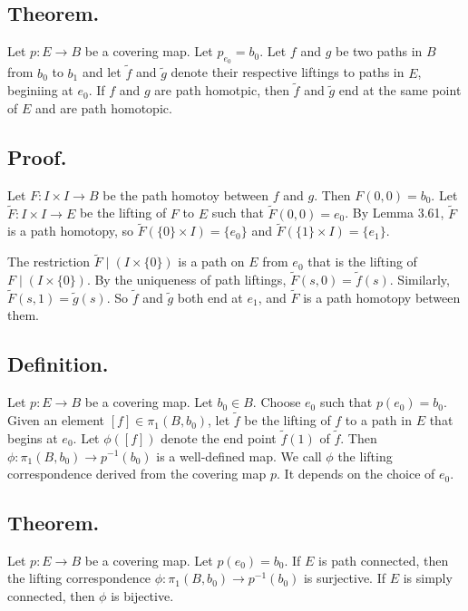 \documentclass[titlepage]{article}
\begin{document}
\subsection{Theorem.} Let $p: E \to B$ be a covering map. Let $p_{e_{0}} = b_{0}$. Let $f$ and $g$ be two paths in $B$ from $b_{0}$ to $b_{1}$ and let $\tilde{f}$ and $\tilde{g}$ denote their respective liftings to paths in $E$, beginiing at $e_{0}$. If $f$ and $g$ are path homotpic, then $\tilde{f}$ and $\tilde{g}$ end at the same point of $E$ and are path homotopic.

\subsection{Proof.} Let $F: I \times I \to B$ be the path homotoy between $f$ and $g$. Then $F(0, 0) = b_{0}$. Let $\tilde{F}: I \times I \to E$ be the lifting of $F$ to $E$ such that $\tilde{F}(0, 0) = e_{0}$. By Lemma 3.61, $\tilde{F}$ is a path homotopy, so $\tilde{F}(\{0\} \times I) = \{e_{0}\}$ and $\tilde{F}(\{1\} \times I) = \{e_{1}\}$.

The restriction $\tilde{F} \mid (I \times \{0\})$ is a path on $E$ from $e_{0}$ that is the lifting of $F \mid (I \times \{0\})$. By the uniqueness of path liftings, $\tilde{F}(s, 0) = \tilde{f}(s)$. Similarly, $\tilde{F}(s, 1) = \tilde{g}(s)$. So $\tilde{f}$ and $\tilde{g}$ both end at $e_{1}$, and $\tilde{F}$ is a path homotopy between them.

\subsection{Definition.} Let $p: E \to B$ be a covering map. Let $b_{0} \in B$. Choose $e_{0}$ such that $p(e_{0}) = b_{0}$. Given an element $[f] \in \pi_{1}(B, b_{0})$, let $\tilde{f}$ be the lifting of $f$ to a path in $E$ that begins at $e_{0}$. Let $\phi([f])$ denote the end point $\tilde{f}(1)$ of $\tilde{f}$. Then $\phi: \pi_{1}(B, b_{0}) \to p^{-1}(b_{0})$ is a well-defined map. We call $\phi$ the lifting correspondence derived from the covering map $p$. It depends on the choice of $e_{0}$.

\subsection{Theorem.} Let $p: E \to B$ be a covering map. Let $p(e_{0}) = b_{0}$. If $E$ is path connected, then the lifting correspondence $\phi: \pi_{1}(B, b_{0}) \to p^{-1}(b_{0})$ is surjective. If $E$ is simply connected, then $\phi$ is bijective.
\end{document}

